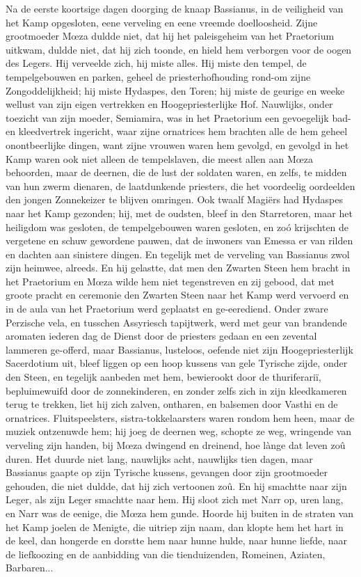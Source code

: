 \documentclass[a4paper, 12pt, oneside, dutch]{article}
\begin{document}
Na de eerste koortsige dagen doorging de knaap Bassianus, in de veiligheid van het Kamp opgesloten, eene verveling en eene vreemde doelloosheid. Zijne grootmoeder Mœza duldde niet, dat hij het paleisgeheim van het Praetorium uitkwam, duldde niet, dat hij zich toonde, en hield hem verborgen voor de oogen des Legers. Hij verveelde zich, hij miste alles. Hij miste den tempel, de tempelgebouwen en parken, geheel de priesterhofhouding rond-om zijne Zongoddelijkheid; hij miste Hydaspes, den Toren; hij miste de geurige en weeke wellust van zijn eigen vertrekken en Hoogepriesterlijke Hof. Nauwlijks, onder toezicht van zijn moeder, Semiamira, was in het Praetorium een gevoegelijk bad- en kleedvertrek ingericht, waar zijne ornatrices hem brachten alle de hem geheel onontbeerlijke dingen, want zijne vrouwen waren hem gevolgd, en gevolgd in het Kamp waren ook niet alleen de tempelslaven, die meest allen aan Mœza behoorden, maar de deernen, die de lust der soldaten waren, en zelfs, te midden van hun zwerm dienaren, de laatdunkende priesters, die het voordeelig oordeelden den jongen Zonnekeizer te blijven omringen. Ook twaalf Magiërs had Hydaspes naar het Kamp gezonden; hij, met de oudsten, bleef in den Starretoren, maar het heiligdom was gesloten, de tempelgebouwen waren gesloten, en zoó krijschten de vergetene en schuw gewordene pauwen, dat de inwoners van Emessa er van rilden en dachten aan sinistere dingen. En tegelijk met de verveling van Bassianus zwol zijn heimwee, alreeds. En hij gelastte, dat men den Zwarten Steen hem bracht in het Praetorium en Mœza wilde hem niet tegenstreven en zij gebood, dat met groote pracht en ceremonie den Zwarten Steen naar het Kamp werd vervoerd en in de aula van het Praetorium werd geplaatst en ge-eerediend. Onder zware Perzische vela, en tusschen Assyriesch tapijtwerk, werd met geur van brandende aromaten iederen dag de Dienst door de priesters gedaan en een zevental lammeren ge-offerd, maar Bassianus, lusteloos, oefende niet zijn Hoogepriesterlijk Sacerdotium uit, bleef liggen op een hoop kussens van gele Tyrische zijde, onder den Steen, en tegelijk aanbeden met hem, bewierookt door de thuriferariï, bepluimewuifd door de zonnekinderen, en zonder zelfs zich in zijn kleedkameren terug te trekken, liet hij zich zalven, ontharen, en balsemen door Vasthi en de ornatrices. Fluitspeelsters, sistra-tokkelaarsters waren rondom hem heen, maar de muziek ontzenuwde hem; hij joeg de deernen weg, schopte ze weg, wringende van verveling zijn handen, bij Mœza dwingend en dreinend, hoe lànge dat leven zoû duren. Het duurde niet lang, nauwlijks acht, nauwlijks tien dagen, maar Bassianus gaapte op zijn Tyrische kussens, gevangen door zijn grootmoeder gehouden, die niet duldde, dat hij zich vertoonen zoû. En hij smachtte naar zijn Leger, als zijn Leger smachtte naar hem. Hij sloot zich met Narr op, uren lang, en Narr was de eenige, die Mœza hem gunde. Hoorde hij buiten in de straten van het Kamp joelen de Menigte, die uitriep zijn naam, dan klopte hem het hart in de keel, dan hongerde en dorstte hem naar hunne hulde, naar hunne liefde, naar de liefkoozing en de aanbidding van die tienduizenden, Romeinen, Aziaten, Barbaren...
\end{document}
